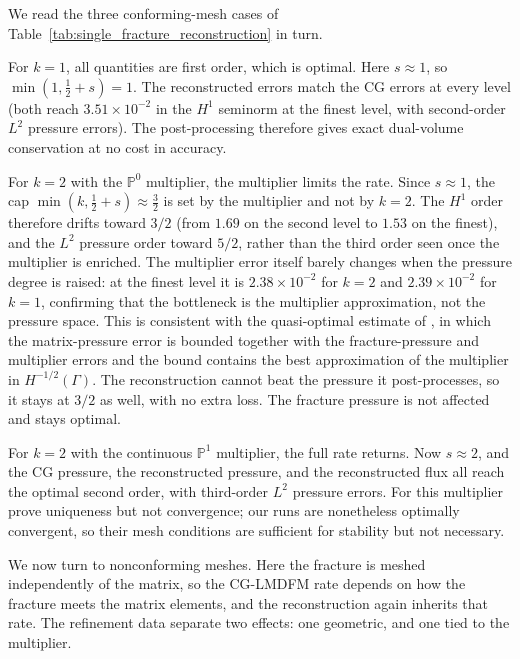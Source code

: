 \documentclass[a4paper,fleqn]{cas-sc}
\begin{document}
We read the three conforming-mesh cases of
Table~\ref{tab:single_fracture_reconstruction} in turn.

For \(k=1\), all quantities are first order, which is optimal. Here \(s\approx1\),
so \(\min(1,\tfrac12+s)=1\). The reconstructed errors match the CG errors at every
level (both reach \(3.51\times10^{-2}\) in the \(H^1\) seminorm at the finest
level, with second-order \(L^2\) pressure errors). The post-processing therefore
gives exact dual-volume conservation at no cost in accuracy.

For \(k=2\) with the \(\mathbb{P}^0\) multiplier, the multiplier limits the rate.
Since \(s\approx1\), the cap \(\min(k,\tfrac12+s)\approx\tfrac32\) is set by the
multiplier and not by \(k=2\). The \(H^1\) order therefore drifts toward \(3/2\)
(from \(1.69\) on the second level to \(1.53\) on the finest), and the \(L^2\)
pressure order toward \(5/2\), rather than the third order seen once the
multiplier is enriched. The multiplier error itself barely changes when the
pressure degree is raised: at the finest level it is \(2.38\times10^{-2}\) for
\(k=2\) and \(2.39\times10^{-2}\) for \(k=1\), confirming that the bottleneck is
the multiplier approximation, not the pressure space. This is consistent with the
quasi-optimal estimate of \citet[Theorems~2 and~3]{Koeppel2019}, in which the
matrix-pressure error is bounded together with the fracture-pressure and
multiplier errors and the bound contains the best approximation of the multiplier
in \(H^{-1/2}(\Gamma)\). The reconstruction cannot beat the pressure it
post-processes, so it stays at \(3/2\) as well, with no extra loss. The fracture
pressure is not affected and stays optimal.

For \(k=2\) with the continuous \(\mathbb{P}^1\) multiplier, the full rate
returns. Now \(s\approx2\), and the CG pressure, the reconstructed pressure, and
the reconstructed flux all reach the optimal second order, with third-order
\(L^2\) pressure errors. For this multiplier \citet[Section~3.3]{Koeppel2019}
prove uniqueness but not convergence; our runs are nonetheless optimally
convergent, so their mesh conditions are sufficient for stability but not
necessary.

We now turn to nonconforming meshes. Here the fracture is meshed independently of
the matrix, so the CG-LMDFM rate depends on how the fracture meets the matrix
elements, and the reconstruction again inherits that rate. The refinement data
separate two effects: one geometric, and one tied to the multiplier.
\end{document}
